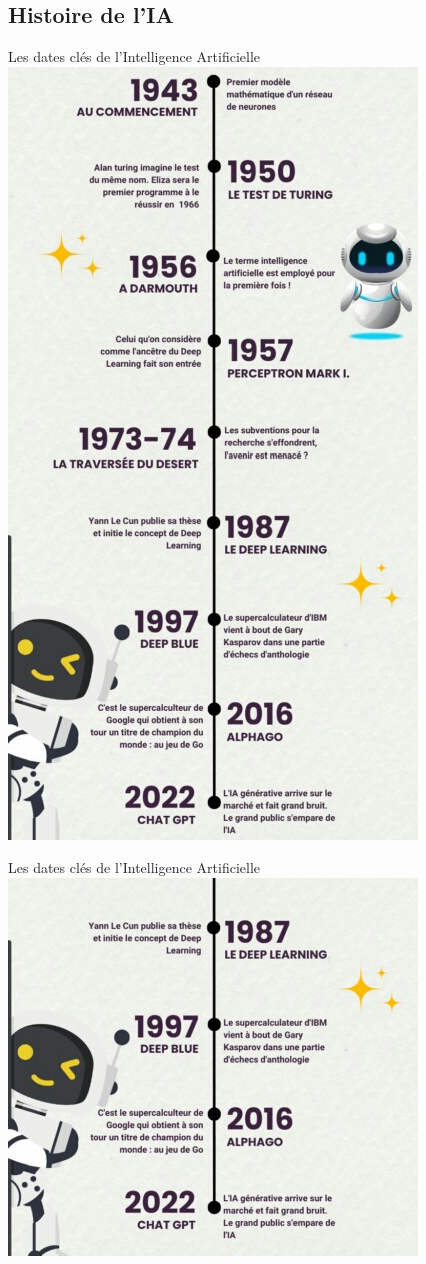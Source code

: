 \documentclass{beamer}
\begin{document}
	\subsection{Histoire de l'IA}
	\begin{frame}{Les dates clés de l'Intelligence Artificielle}
		\centering
\includegraphics[width=0.6\linewidth]{AIhistory.jpeg}
	\end{frame}

\begin{frame}{Les dates clés de l'Intelligence Artificielle}
	\centering
	\includegraphics[width=0.6\linewidth]{hia.jpeg}
\end{frame}
\end{document}
